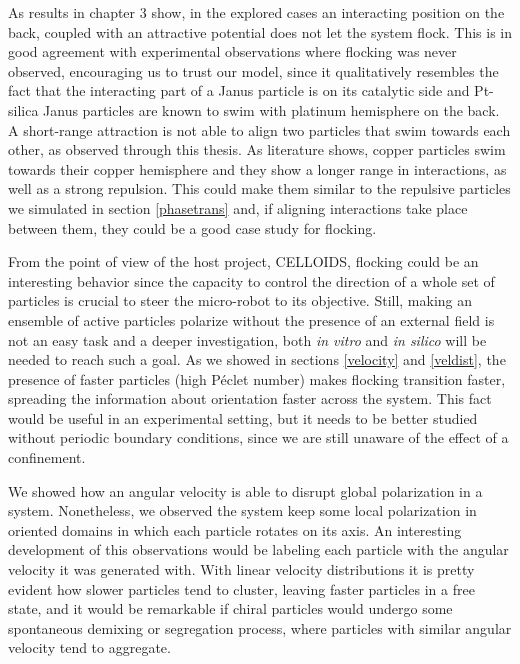 \documentclass[../../master_thesis_np.tex]{subfiles}
\begin{document}
As results in chapter 3 show, in the explored cases an interacting position on the back, coupled with an attractive potential does not let the system flock.
This is in good agreement with experimental observations where flocking was never observed, encouraging us to trust our model, since it qualitatively resembles the fact that the interacting part of a Janus particle is on its catalytic side and Pt-silica Janus particles are known to swim with platinum hemisphere on the back.
A short-range attraction is not able to align two particles that swim towards each other, as observed through this thesis.
As literature \cite{sharan_pair_2023} shows, copper particles swim towards their copper hemisphere and they show a longer range in interactions, as well as a strong repulsion.
This could make them similar to the repulsive particles we simulated in section \ref{phasetrans} and, if aligning interactions take place between them, they could be a good case study for flocking.

From the point of view of the host project, CELLOIDS, flocking could be an interesting behavior since the capacity to control the direction of a whole set of particles is crucial to steer the micro-robot to its objective.
Still, making an ensemble of active particles polarize without the presence of an external field is not an easy task and a deeper investigation, both \emph{in vitro} and \emph{in silico} will be needed to reach such a goal.
As we showed in sections \ref{velocity} and \ref{veldist}, the presence of faster particles (high Péclet number) makes flocking transition faster, spreading the information about orientation faster across the system.
This fact would be useful in an experimental setting, but it needs to be better studied without periodic boundary conditions, since we are still unaware of the effect of a confinement.

We showed how an angular velocity is able to disrupt global polarization in a system. 
Nonetheless, we observed the system keep some local polarization in oriented domains in which each particle rotates on its axis.
An interesting development of this observations would be labeling each particle with the angular velocity it was generated with.
With linear velocity distributions it is pretty evident how slower particles tend to cluster, leaving faster particles in a free state, and it would be remarkable if chiral particles would undergo some spontaneous demixing or segregation process, where particles with similar angular velocity tend to aggregate.
\end{document}
